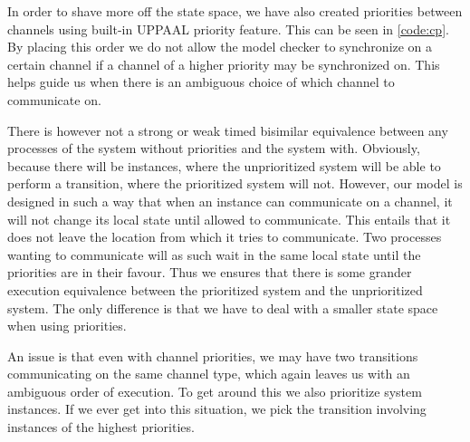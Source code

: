 In order to shave more off the state space, we have also created priorities between channels using built-in UPPAAL priority feature. This can be seen in \cref{code:cp}. By placing this order we do not allow the model checker to synchronize on a certain channel if a channel of a higher priority may be synchronized on. This helps guide us when there is an ambiguous choice of which channel to communicate on.

There is however not a strong or weak timed bisimilar equivalence between any processes of the system without priorities and the system with. Obviously, because there will be instances, where the unprioritized system will be able to perform a transition, where the prioritized system will not. However, our model is designed in such a way that when an instance can communicate on a channel, it will not change its local state until allowed to communicate. This entails that it does not leave the location from which it tries to communicate. Two processes wanting to communicate will as such wait in the same local state until the priorities are in their favour. Thus we ensures that there is some grander execution equivalence between the prioritized system and the unprioritized system. The only difference is that we have to deal with a smaller state space when using priorities. 

An issue is that even with channel priorities, we may have two transitions communicating on the same channel type, which again leaves us with an ambiguous order of execution. To get around this we also prioritize system instances. If we ever get into this situation, we pick the transition involving instances of the highest priorities. 




